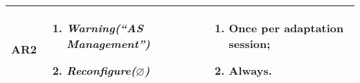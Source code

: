\begin{table}
\begin{small}
\begin{tabular}{ | p{15mm} | p{77mm} | p{55mm} |}
AR2 &
\vspace{-2mm}\begin{enumerate}[topsep=0cm, partopsep=0cm, itemsep=0cm, parsep=0cm, leftmargin=0.5cm]
\item \textit{Warning(``AS Management'')}
\item \textit{Reconfigure($\varnothing$)}
\end{enumerate}\vspace{-4mm} &
\vspace{-2mm}\begin{enumerate}[topsep=0cm, partopsep=0cm, itemsep=0cm, parsep=0cm, leftmargin=0.5cm]
\item Once per adaptation session;
\item Always.
\end{enumerate}\vspace{-4mm}
\\\hline
\end{tabular}
\end{small}
\end{table}
